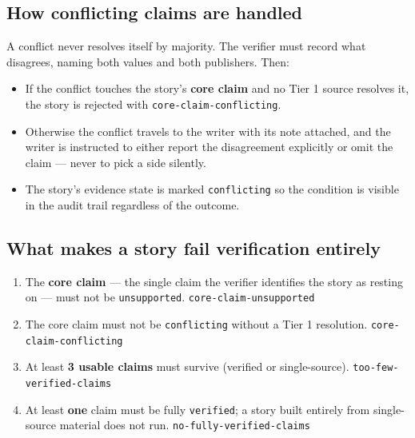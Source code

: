 \documentclass[11pt,a4paper]{article}
\newcommand{\brk}{\hyphenpenalty=0\exhyphenpenalty=0\relax}
\newcommand{\code}[1]{\texttt{\small\brk #1}}
\begin{document}
\subsection{How conflicting claims are handled}

A conflict never resolves itself by majority. The verifier must record what
disagrees, naming both values and both publishers. Then:

\begin{itemize}[leftmargin=1.2em,itemsep=0.25em]
  \item If the conflict touches the story's \textbf{core claim} and no Tier 1
    source resolves it, the story is rejected with \code{core-claim-conflicting}.
  \item Otherwise the conflict travels to the writer with its note attached, and
    the writer is instructed to either report the disagreement explicitly or omit
    the claim --- never to pick a side silently.
  \item The story's evidence state is marked \code{conflicting} so the condition
    is visible in the audit trail regardless of the outcome.
\end{itemize}

\subsection{What makes a story fail verification entirely}

\begin{blockbox}
\begin{enumerate}[leftmargin=1.4em,itemsep=0.2em,topsep=0.2em]
  \item The \textbf{core claim} --- the single claim the verifier identifies the
    story as resting on --- must not be \code{unsupported}.
    \hfill\code{core-claim-unsupported}
  \item The core claim must not be \code{conflicting} without a Tier 1
    resolution. \hfill\code{core-claim-conflicting}
  \item At least \textbf{3 usable claims} must survive (verified or
    single-source). \hfill\code{too-few-}\allowbreak\code{verified-claims}
  \item At least \textbf{one} claim must be fully \code{verified}; a story built
    entirely from single-source material does not run.
    \hfill\code{no-fully-}\allowbreak\code{verified-claims}
\end{enumerate}
\end{blockbox}
\end{document}
